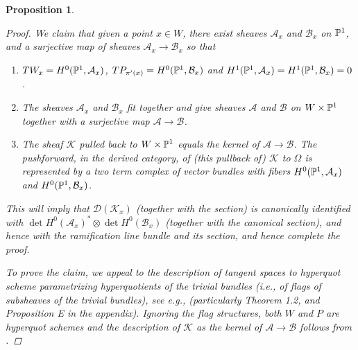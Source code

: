 \documentclass[11pt]{amsart}
\newcommand\mk{\mathcal{K}}
\newcommand\ma{\mathcal{A}}
\newcommand\mb{\mathcal{B}}
\newtheorem{proposition}[theorem]{Proposition}
\numberwithin{theorem}{subsection}
\begin{document}
{\begin{proposition}
\begin{proof}
We claim that given a point $x\in W$, there exist sheaves $\mathcal{A}_x$ and $\mathcal{B}_x$ on $\Bbb{P}^1$, and a surjective map of sheaves $\mathcal{A}_x\to \mathcal{B}_x$  so that
\begin{enumerate}
\item $TW_x =H^0(\Bbb{P}^1, \mathcal{A}_x)$, $TP_{\pi'(x)}=H^0(\Bbb{P}^1,\mathcal{B}_x)$ and $H^1(\Bbb{P}^1,\mathcal{A}_x)=H^1(\Bbb{P}^1,\mathcal{B}_x)=0$.
\item The sheaves $\mathcal{A}_x$ and $\mathcal{B}_x$ fit together and give sheaves $\mathcal{A}$ and $\mathcal{B}$ on $W\times \Bbb{P}^1$ together with a surjective map $\mathcal{A}\to \mathcal{B}$.
\item The sheaf $\mathcal{K}$ pulled back to $W\times\Bbb{P}^1$ equals the kernel of  $\mathcal{A}\to \mathcal{B}$. The pushforward, in the derived category, of (this pullback of) $\mk$ to $\Omega$
    is represented by a two term complex of vector bundles with fibers $H^0(\Bbb{P}^1, \mathcal{A}_x)$ and $H^0(\Bbb{P}^1,\mathcal{B}_x)$.
\end{enumerate}
This will imply that $\mathcal{D}(\mk_x)$ (together with the section) is canonically identified with $\det H^0(\ma_x)^*\otimes \det H^0(\mb_x)$ (together with the canonical section), and hence with the ramification line bundle and its section, and hence complete the proof.


To prove the claim, we appeal to the description of tangent spaces to hyperquot scheme parametrizing hyperquotients of the trivial bundles (i.e., of flags of subsheaves of the trivial bundles), see e.g., \cite{CF} (particularly Theorem 1.2, and Proposition E in the appendix). Ignoring the flag structures, both $W$ and $P$ are hyperquot schemes and the description of $\mk$ as the kernel of $\ma\to \mb$ follows from \cite[Prop. E]{CF}.


\end{proof}
\end{proposition}}
\end{document}
